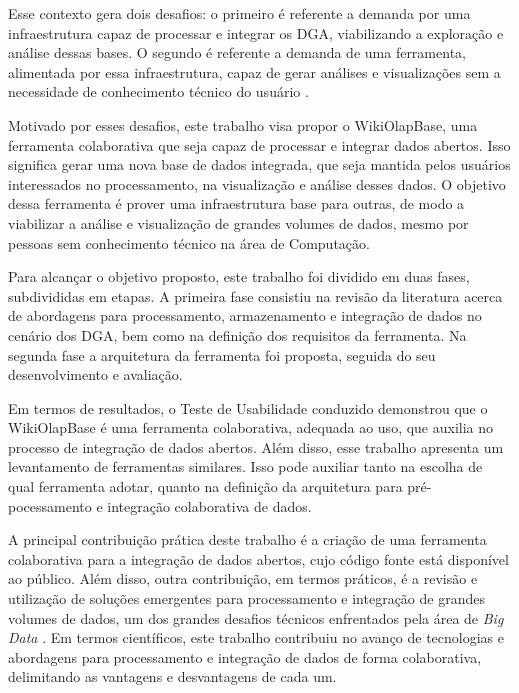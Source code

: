 Esse contexto gera dois desafios: o primeiro é referente a demanda por uma infraestrutura 
capaz de processar e integrar os DGA, viabilizando a exploração e análise dessas bases. 
O segundo é referente a demanda de uma ferramenta, alimentada por essa infraestrutura, capaz 
de gerar análises e visualizações sem a necessidade de conhecimento técnico do usuário 
\cite{graves2013}.

Motivado por esses desafios, este trabalho visa propor o WikiOlapBase, uma ferramenta 
colaborativa que seja capaz de processar e integrar dados abertos. Isso significa gerar uma 
nova base de dados integrada, que seja mantida pelos usuários interessados no processamento, 
na visualização e análise desses dados. O objetivo dessa ferramenta é prover uma infraestrutura
base para outras, de modo a viabilizar a análise e visualização de grandes 
volumes de dados, mesmo por pessoas sem conhecimento técnico na área de Computação. 

Para alcançar o objetivo proposto, este trabalho foi dividido em duas fases, subdivididas 
em etapas. A primeira fase consistiu na revisão da literatura acerca de abordagens para 
processamento, armazenamento e integração de dados no cenário dos DGA, bem como na definição 
dos requisitos da ferramenta. Na segunda fase a arquitetura da ferramenta foi proposta, 
seguida do seu desenvolvimento e avaliação.

Em termos de resultados, o Teste de Usabilidade conduzido demonstrou que o WikiOlapBase é uma
ferramenta colaborativa, adequada ao uso, que auxilia no processo de integração de dados 
abertos. Além disso, esse trabalho apresenta um levantamento de ferramentas similares. Isso
pode auxiliar tanto na escolha de qual ferramenta adotar, quanto na definição da arquitetura
para pré-pocessamento e integração colaborativa de dados.

A principal contribuição prática deste trabalho é a criação de uma ferramenta colaborativa para
a integração de dados abertos, cujo código fonte está disponível ao público. Além disso, outra
contribuição, em termos práticos, é a revisão e utilização de soluções emergentes para
processamento e integração de grandes volumes de dados, um dos grandes desafios técnicos 
enfrentados pela área de \textit{Big Data} \cite{jagadish2014}. Em termos científicos, este
trabalho contribuiu no avanço de tecnologias e abordagens para processamento e integração
de dados de forma colaborativa, delimitando as vantagens e desvantagens de cada um.

